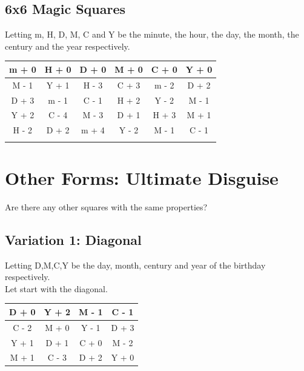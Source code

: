\documentclass[a4paper,12pt,oneside]{book}
\begin{document}
    \subsection{6x6 Magic Squares}
        Letting m, H, D, M, C and Y be the minute, the hour, the day, the month, the century and the year respectively. \\
        \def\arraystretch{2}
        \begin{center}
            \begin{tabular}{|c|c|c|c|c|c|}
                \hline
                 m + 0 & H + 0 & D + 0 & M + 0 & C + 0 & Y + 0  \\
                 \hline
                 M - 1 & Y + 1 & H - 3 & C + 3 & m - 2 & D + 2\\
                 \hline
                 D + 3 & m - 1 & C - 1 & H + 2 & Y - 2 & M - 1\\
                 \hline
                 Y + 2 & C - 4 & M - 3 & D + 1 & H + 3 & M + 1\\
                 \hline
                 H - 2 & D + 2 & m + 4 & Y - 2 & M - 1 & C - 1 \\
                 \hline
                  \\
                 \hline
            \end{tabular}
        \end{center}

\section{Other Forms: Ultimate Disguise}
Are there any other squares with the same properties?

    \subsection{Variation 1: Diagonal}
        Letting D,M,C,Y be the day, month, century and year of the birthday respectively. \\
        Let start with the diagonal. \\
        \def\arraystretch{2}
        \begin{center}
            \begin{tabular}{|c|c|c|c|}
                \hline
                D + 0 & Y + 2 & M - 1 & C - 1 \\
                \hline
                C - 2 & M + 0 & Y - 1 & D + 3 \\
                \hline
                Y + 1 & D + 1 & C + 0 & M - 2 \\
                \hline
                M + 1 & C - 3 & D + 2 & Y + 0 \\
                \hline
            \end{tabular}
        \end{center}
\end{document}
